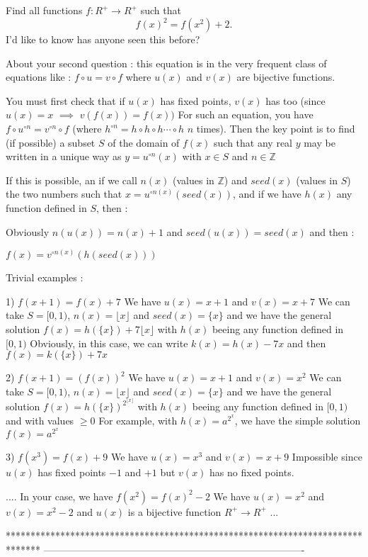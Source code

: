 \begin{mysolution}
	\begin{tcolorbox}Find all functions $f: R^{+}\to R^{+}$ such that
\[f(x)^{2}=f(x^{2})+2. \]
I'd like to know has anyone seen this before?\end{tcolorbox}

About your second question : this equation is in the very frequent class of equations like : $f\circ u=v\circ f$ where $u(x)$ and $v(x)$ are bijective functions.

You must first check that if $u(x)$ has fixed points, $v(x)$ has too  (since $u(x)=x$ $\implies$ $v(f(x))=f(x))$
For such an equation, you have $f\circ u^{\circ n}=v^{\circ n}\circ f$ (where $h^{\circ n}=h\circ h\circ h\cdots \circ h$ $n$ times).
Then the key point is to find (if possible) a subset $S$ of the domain of $f(x)$ such that any real $y$ may be written in a unique way as $y=u^{\circ n}(x)$ with $x\in S$ and $n\in\mathbb{Z}$

If this is possible, an if we call $n(x)$ (values in $\mathbb{Z}$) and $seed(x)$ (values in $S$) the two numbers such that $x=u^{\circ n(x)}(seed(x))$, and if we have $h(x)$ any function defined in $S$, then :

Obviously $n(u(x))=n(x)+1$ and $seed(u(x))=seed(x)$ and then :

$f(x)=v^{\circ n(x)}(h(seed(x)))$

Trivial examples :

1) $f(x+1)=f(x)+7$
We have $u(x)=x+1$ and $v(x)=x+7$
We can take $S=[0,1)$, $n(x)=\lfloor x\rfloor$ and $seed(x)=\{x\}$ and we have the general solution $f(x)=h(\{x\})+7\lfloor x \rfloor$ with $h(x)$ beeing any function defined in $[0,1)$ 
Obviously, in this case, we can write $k(x)=h(x)-7x$ and then $f(x)=k(\{x\})+7x$

2) $f(x+1)=(f(x))^{2}$
We have $u(x)=x+1$ and $v(x)=x^{2}$
We can take $S=[0,1)$, $n(x)=\lfloor x\rfloor$ and $seed(x)=\{x\}$ and we have the general solution $f(x)=h(\{x\})^{2^{\lfloor x \rfloor}}$ with $h(x)$ beeing any function defined in $[0,1)$ and with values $\geq 0$
For example, with $h(x)=a^{2^{x}}$, we have the simple solution $f(x)=a^{2^{x}}$

3) $f(x^{3})=f(x)+9$
We have $u(x)=x^{3}$ and $v(x)=x+9$
Impossible since $u(x)$ has fixed points $-1$ and $+1$ but $v(x)$ has no fixed points.

....
In your case, we have $f(x^{2})=f(x)^{2}-2$
We have $u(x)=x^{2}$ and $v(x)=x^{2}-2$ and $u(x)$ is a bijective function  $R^{+}\to R^{+}$
...
\end{mysolution}
*******************************************************************************
-------------------------------------------------------------------------------

